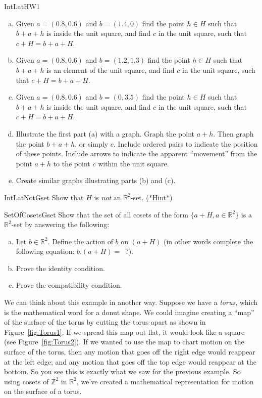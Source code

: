 \begin{exercise}{IntLatHW1}
\begin{enumerate}[(a)]
\item Given $a=(0.8,0.6)$ and $b=(1.4,0)$ find the point $h\in H$ such that $b+a+h$ is inside the unit square, and find $c$ in the unit square, such that $c+H=b+a+H$.
\item Given $a=(0.8,0.6)$ and $b=(1.2,1.3)$ find the point $h\in H$ such that $b+a+h$ is an element of the unit square, and find $c$ in the unit square, such that $c+H=b+a+H$.
\item Given $a=(0.8,0.6)$ and $b=(0,3.5)$ find the point $h\in H$ such that $b+a+h$ is inside the unit square, and find $c$ in the unit square, such that $c+H=b+a+H$.
\item Illustrate the first part (a) with a graph.  Graph the point $a+h$.  Then graph the point $b+a+h$, or simply $c$.  Include ordered pairs to indicate the position of these points. Include arrows to indicate the apparent ``movement'' from the point $a+h$ to the point $c$ within the unit square.
\item Create similar graphs illustrating parts (b) and (c).
\end{enumerate}
\end{exercise}

\begin{exercise}{IntLatNotGset} Show that $H$ is \emph{not} an $\mathbb{R}^2$-set. \hyperref[sec:actions:hints]{(*Hint*)}
\end{exercise}

\begin{exercise}{SetOfCosetsGset} Show that the set of all cosets of the form $\{a+H, a \in \mathbb{R}^2\}$ is a $\mathbb{R}^2$-set by answering the following:
\begin{enumerate}[(a)]
\item Let $b \in \mathbb{R}^2$. Define the action of $b$ on $(a+H)$ (in other words complete the following equation: $b.(a+H)=$~?).
\item Prove the identity condition.
\item Prove the compatibility condition.
\end{enumerate}
\end{exercise}


We can think about this example in another way. Suppose we have a \emph{torus}, which is the mathematical word for a donut shape. We could imagine creating a ``map'' of the surface of the torus by cutting the torus apart as shown in Figure~\ref{fig:Torus1}. If we spread this map out flat, it would look like a square (see Figure~\ref{fig:Torus2}). If we wanted to use the map to chart motion on the surface of the torus, then any motion that goes off the right edge would reappear at the left edge; and any motion that goes off the top edge would reappear at the bottom. So you see this is exactly what we saw for the previous example. So using cosets of $\mathbb{Z}^2$ in $\mathbb{R}^2$, we've created a mathematical representation for motion on the surface of a torus.

